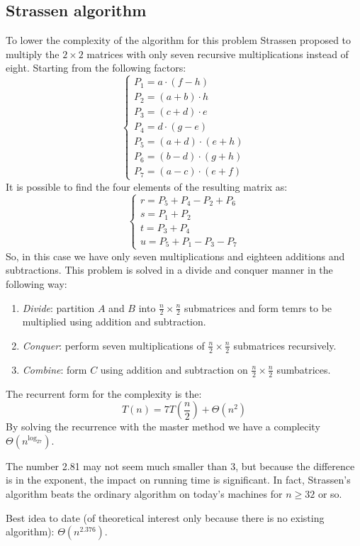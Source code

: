 \subsection{Strassen algorithm}
To lower the complexity of the algorithm for this problem Strassen proposed to multiply the $2 \times 2$ matrices with only seven recursive multiplications instead of eight. 
Starting from the following factors: 
\[\begin{cases} P_1=a\cdot(f-h) \\ P_2=(a+b)\cdot h \\ P_3=(c+d)\cdot e \\ P_4=d\cdot(g-e) \\ P_5=(a+d)\cdot(e+h) \\ P_6=(b-d)\cdot(g+h) \\ P_7=(a-c)\cdot(e+f) \end{cases}\]
It is possible to find the four elements of the resulting matrix as: 
\[\begin{cases} r=P_5+P_4-P_2+P_6 \\ s=P_1+P_2 \\ t=P_3+P_4 \\ u=P_5+P_1-P_3-P_7 \end{cases}\]
So, in this case we have only seven multiplications and eighteen additions and subtractions. 
This problem is solved in a divide and conquer manner in the following way: 
\begin{enumerate}
    \item \textit{Divide}: partition $A$ and $B$ into $\frac{n}{2}\times\frac{n}{2}$ submatrices and form temrs to be multiplied using addition and subtraction.
    \item \textit{Conquer}: perform seven multiplications of $\frac{n}{2}\times\frac{n}{2}$ submatrices recursively.
    \item \textit{Combine}: form $C$ using addition and subtraction on $\frac{n}{2}\times\frac{n}{2}$ sumbatrices. 
\end{enumerate}
The recurrent form for the complexity is the: 
\[T(n)=7T\left(\dfrac{n}{2}\right)+\Theta(n^2)\]
By solving the recurrence with the master method we have a complecity $\Theta(n^{\log_27})$. 

The number 2.81 may not seem much smaller than 3, but because the difference is in the exponent, the impact on running time is significant. 
In fact, Strassen's algorithm beats the ordinary algorithm on today's machines for $n \geq 32$ or so.

Best idea to date (of theoretical interest only because there is no existing algorithm): $\Theta(n^{2.376})$.